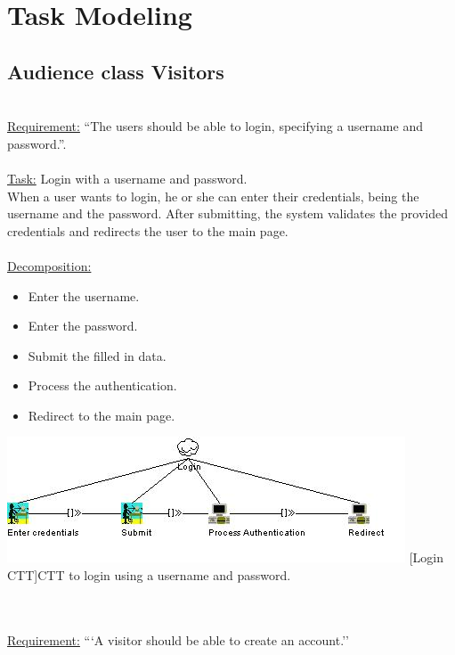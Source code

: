 \documentclass[11pt, a4paper,svglistings,oneside]{book}
\begin{document}
\section{Task Modeling}

\subsection{Audience class Visitors}
$\;$ \\
\underline{Requirement:} ``The users should be able to login, specifying a username and password.''. \\ \\
\underline{Task:} Login with a username and password. \\
When a user wants to login, he or she can enter their credentials, being the username and the password. After submitting, the system validates the provided credentials and redirects the user to the main page. \\ \\
\underline{Decomposition:}
\begin{itemize}
\item Enter the username.
\item Enter the password.
\item Submit the filled in data.
\item Process the authentication.
\item Redirect to the main page.
\end{itemize}
\noindent\begin{minipage}{\textwidth}
    \centering
   \includegraphics[width=\textwidth]{CTT_Login.png}
 [Login CTT]{CTT to login using a username and password.}
\end{minipage}
$\;$ \\ \\
\underline{Requirement:} ```A visitor should be able to create an account.'' \\ \\ 
\end{document}

